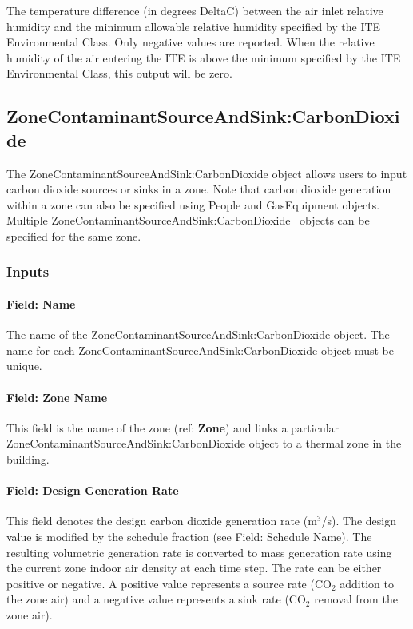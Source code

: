 The temperature difference (in degrees DeltaC) between the air inlet relative humidity and the minimum allowable relative humidity specified by the ITE Environmental Class. Only negative values are reported. When the relative humidity of the air entering the ITE is above the minimum specified by the ITE Environmental Class, this output will be zero.

\subsection{ZoneContaminantSourceAndSink:CarbonDioxide}\label{zonecontaminantsourceandsinkcarbondioxide}

The ZoneContaminantSourceAndSink:CarbonDioxide object allows users to input carbon dioxide sources or sinks in a zone. Note that carbon dioxide generation within a zone can also be specified using People and GasEquipment objects. Multiple ZoneContaminantSourceAndSink:CarbonDioxide~ objects can be specified for the same zone.

\subsubsection{Inputs}\label{inputs-10-008}

\paragraph{Field: Name}\label{field-name-10-007}

The name of the ZoneContaminantSourceAndSink:CarbonDioxide object. The name for each ZoneContaminantSourceAndSink:CarbonDioxide object must be unique.

\paragraph{Field: Zone Name}\label{field-zone-name-2-003}

This field is the name of the zone (ref: \textbf{Zone}) and links a particular ZoneContaminantSourceAndSink:CarbonDioxide object to a thermal zone in the building.

\paragraph{Field: Design Generation Rate}\label{field-design-generation-rate}

This field denotes the design carbon dioxide generation rate (m\(^{3}\)/s). The design value is modified by the schedule fraction (see Field: Schedule Name). The resulting volumetric generation rate is converted to mass generation rate using the current zone indoor air density at each time step. The rate can be either positive or negative. A positive value represents a source rate (CO\(_{2}\) addition to the zone air) and a negative value represents a sink rate (CO\(_{2}\) removal from the zone air).

